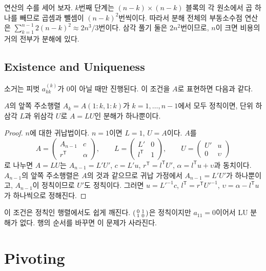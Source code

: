 연산의 수를 세어 보자. $k$번째 단계는 $(n-k)\times(n-k)$ 블록의 각 원소에서 곱 하나를 빼므로 곱셈과 뺄셈이 $(n-k)^2$번씩이다. 따라서 분해 전체의 부동소수점 연산은 $\sum_{k=1}^{n-1}2(n-k)^2\approx2n^3/3$번이다. 삼각 풀기 둘은 $2n^2$번이므로, $n$이 크면 비용의 거의 전부가 분해에 있다.

\subsection{Existence and Uniqueness}

소거는 피벗 $a_{kk}^{(k)}$가 $0$이 아닐 때만 진행된다. 이 조건을 $A$로 표현하면 다음과 같다.

\begin{theorem}
\label{thm:lu-exists}
$A$의 앞쪽 주소행렬 $A_k=A(1{:}k,1{:}k)$가 $k=1,\dots,n-1$에서 모두 정칙이면, 단위 하삼각 $L$과 위삼각 $U$로 $A=LU$인 분해가 하나뿐이다.
\end{theorem}

\begin{proof}
$n$에 대한 귀납법이다. $n=1$이면 $L=1$, $U=A$이다. $A$를
\[
A=\begin{pmatrix}A_{n-1}&c\\r^{\mathsf T}&\alpha\end{pmatrix},\qquad
L=\begin{pmatrix}L'&0\\l^{\mathsf T}&1\end{pmatrix},\qquad
U=\begin{pmatrix}U'&u\\0&\upsilon\end{pmatrix}
\]
로 나누면 $A=LU$는 $A_{n-1}=L'U'$, $c=L'u$, $r^{\mathsf T}=l^{\mathsf T}U'$, $\alpha=l^{\mathsf T}u+\upsilon$과 동치이다. $A_{n-1}$의 앞쪽 주소행렬은 $A$의 것과 같으므로 귀납 가정에서 $A_{n-1}=L'U'$가 하나뿐이고, $A_{n-1}$이 정칙이므로 $U'$도 정칙이다. 그러면 $u=L'^{-1}c$, $l^{\mathsf T}=r^{\mathsf T}U'^{-1}$, $\upsilon=\alpha-l^{\mathsf T}u$가 하나씩으로 정해진다.
\end{proof}

이 조건은 정칙인 행렬에서도 쉽게 깨진다. $\begin{psmallmatrix}0&1\\1&0\end{psmallmatrix}$은 정칙이지만 $a_{11}=0$이어서 LU 분해가 없다. 행의 순서를 바꾸면 이 문제가 사라진다.

\section{Pivoting}
\label{sec:pivoting}

